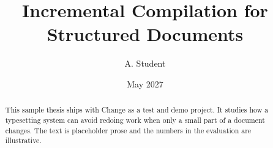 \documentclass[12pt]{report}
\title{Incremental Compilation for Structured Documents}
\author{A. Student}
\date{May 2027}
\begin{document}
\hypersetup{pageanchor=false}
\maketitle

\begin{abstract}
This sample thesis ships with Change as a test and demo project. It studies
how a typesetting system can avoid redoing work when only a small part of a
document changes. The text is placeholder prose and the numbers in the
evaluation are illustrative.
\end{abstract}
\hypersetup{pageanchor=true}

\tableofcontents









\end{document}
